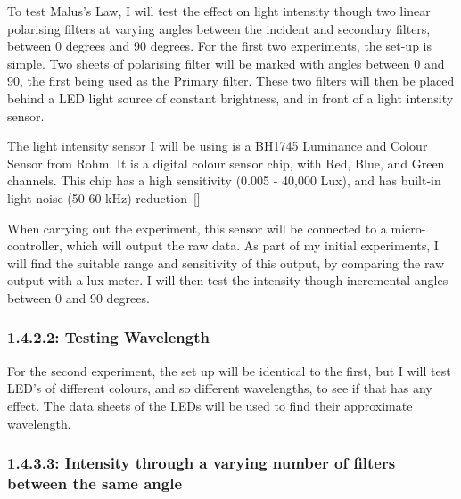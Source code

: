 \documentclass{article}
\begin{document}
\noindent{}To test Malus's Law, I will test the effect on light intensity though two linear polarising filters at varying angles between the incident and secondary filters, between 0 degrees and 90 degrees. For the first two experiments, the set-up is simple. Two sheets of polarising filter will be marked with angles between 0 and 90, the first being used as the Primary filter. These two filters will then be placed behind a LED light source of constant brightness, and in front of a light intensity sensor.%

The light intensity sensor I will be using is a BH1745 Luminance and Colour Sensor from Rohm. It is a digital colour sensor chip, with Red, Blue, and Green channels. This chip has a high sensitivity (0.005 - 40,000 Lux), and has built-in light noise (50-60 kHz) reduction~{}[]%

When carrying out the experiment, this sensor will be connected to a micro-controller, which will output the raw data. As part of my initial experiments, I will find the suitable range and sensitivity of this output, by comparing the raw output with a lux-meter. I will then test the intensity though incremental angles between 0 and 90 degrees.%

\subsubsection{1.4.2.\hspace*{0.5em}2: Testing Wavelength}\label{sec-2--testing-wavelength}%

\noindent{}For the second experiment, the set up will be identical to the first, but I will test LED's of different colours, and so different wavelengths, to see if that has any effect. The data sheets of the LEDs will be used to find their approximate wavelength.%

\subsubsection{1.4.3.\hspace*{0.5em}3: Intensity through a varying number of filters between the same angle}\label{sec-3--intensity-through-a-varying-number-of-filters-between-the-same-angle}%
\end{document}
